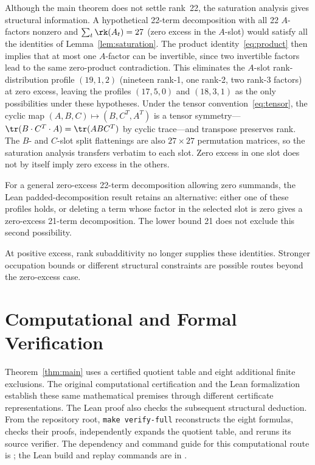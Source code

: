 \documentclass[11pt,a4paper]{article}
\begin{document}
Although the main theorem does not settle rank~22, the saturation analysis gives structural information.  A hypothetical 22-term decomposition with all 22 $A$-factors nonzero and $\sum_t\rk(A_t)=27$ (zero excess in the $A$-slot) would satisfy all the identities of Lemma~\ref{lem:saturation}.  The product identity~\eqref{eq:product} then implies that at most one $A$-factor can be invertible, since two invertible factors lead to the same zero-product contradiction.  This eliminates the $A$-slot rank-distribution profile $(19,1,2)$ (nineteen rank-1, one rank-2, two rank-3 factors) at zero excess, leaving the profiles $(17,5,0)$ and $(18,3,1)$ as the only possibilities under these hypotheses.  Under the tensor convention~\eqref{eq:tensor}, the cyclic map $(A,B,C)\mapsto(B,C^T,A^T)$ is a tensor symmetry---$\tr(B\cdot C^T\cdot A)=\tr(ABC^T)$ by cyclic trace---and transpose preserves rank.  The $B$- and $C$-slot split flattenings are also $27\times 27$ permutation matrices, so the saturation analysis transfers verbatim to each slot.  Zero excess in one slot does not by itself imply zero excess in the others.

For a general zero-excess 22-term decomposition allowing zero summands,
the Lean padded-decomposition result retains an alternative: either one
of these profiles holds, or deleting a term whose factor in the selected
slot is zero gives a zero-excess 21-term decomposition. The lower bound
21 does not exclude this second possibility.

At positive excess, rank subadditivity no longer supplies these identities. Stronger occupation bounds or different structural constraints are possible routes beyond the zero-excess case.


\section{Computational and Formal Verification}\label{sec:machine}

Theorem~\ref{thm:main} uses a certified quotient table and eight additional
finite exclusions. The original computational certification and the Lean
formalization establish these same mathematical premises through different
certificate representations. The Lean proof also checks the subsequent
structural deduction. From the repository root, \texttt{make verify-full}
reconstructs the eight formulas, checks their proofs, independently expands
the quotient table, and reruns its source verifier. The dependency and
command guide for this computational route is ;
the Lean build and replay commands are in .
\end{document}
